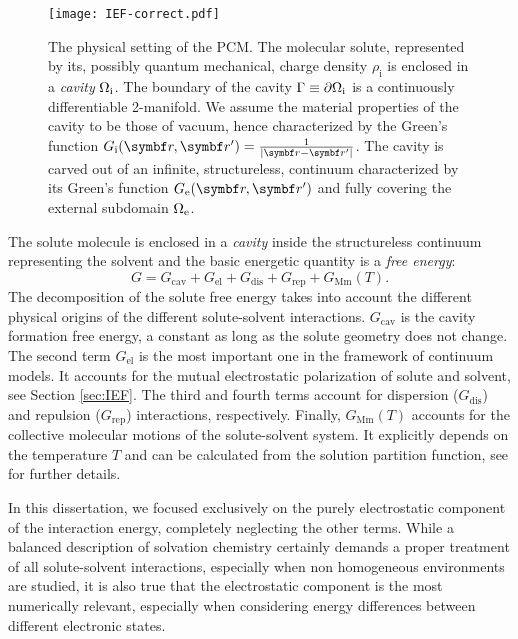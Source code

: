 \begin{figure}[!h]
  \centering
  \texttt{[image: IEF-correct.pdf]}
  \caption[The physical setting of the polarizable continuum model.]{
  The physical setting of the \gls{PCM}. The molecular solute,
  represented by its, possibly quantum mechanical, charge density
  $\rho_\mathrm{i}$ is enclosed in a \emph{cavity} $\Omega_\mathrm{i}$.
  The boundary of the cavity $\Gamma\equiv\partial\Omega_\mathrm{i}$ is a
  continuously differentiable 2-manifold.
  We assume the material properties of the cavity to be those of vacuum,
  hence characterized by the Green's function
  $\Gi=\frac{1}{|\vect{r}-\vect{r}^\prime|}$.
  The cavity is carved out of an infinite, structureless, continuum
  characterized by its Green's function $\Ge$ and fully covering the
  external subdomain $\Omega_\mathrm{e}$.
  }
  \label{fig:IEF}
\end{figure}

The solute molecule is enclosed in a \emph{cavity} inside the
structureless continuum representing the solvent and the basic energetic
quantity is a \emph{free energy}:\autocite{Tomasi1994-gv,
Amovilli1998-pv, Tomasi2005-vm}
\begin{equation}\label{eq:free-energy}
 G = G_\mathrm{cav} + G_\mathrm{el} + G_\mathrm{dis} + G_\mathrm{rep} + G_\mathrm{Mm}(T).
\end{equation}
The decomposition of the solute free energy takes into account the
different physical origins of the different solute-solvent interactions.
$G_\mathrm{cav}$ is the cavity formation free energy, a constant as long
as the solute geometry does not change.\autocite{Tomasi1994-gv,
Floris1997-tu}
The second term $G_\mathrm{el}$ is the most important one in the
framework of continuum models. It accounts for the mutual electrostatic
polarization of solute and solvent, see Section \ref{sec:IEF}.
The third and fourth terms account for
dispersion ($G_\mathrm{dis}$) and repulsion ($G_\mathrm{rep}$) interactions,
respectively.\autocite{Amovilli1997-fo, Weijo2010-jy}
Finally, $G_\mathrm{Mm}(T)$ accounts for the collective molecular
motions of the solute-solvent system. It explicitly depends on the
temperature $T$ and can be calculated from the solution partition
function, see  for further details.

In this dissertation, we focused exclusively on the purely electrostatic
component of the interaction energy, completely neglecting the other
terms.
While a balanced description of solvation chemistry certainly demands
a proper treatment of all solute-solvent interactions, especially when
non homogeneous environments are studied,\autocite{Mozgawa2014-ad,
Mozgawa2016-wf} it is also true that the electrostatic component is the
most numerically relevant, especially when considering energy
differences between different electronic states.

